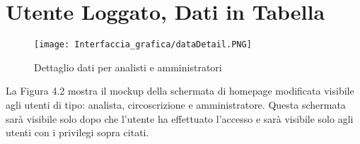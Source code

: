 \newpage
\section{Utente Loggato, Dati in Tabella}

    \begin{figure}[H]
        \center
        \texttt{[image: Interfaccia\_grafica/dataDetail.PNG]}
        \caption{Dettaglio dati per analisti e amministratori}
    \end{figure}    

    La Figura 4.2 mostra il mockup della schermata di homepage modificata visibile agli utenti di tipo: analista, circoscrizione e amministratore. Questa schermata sarà visibile solo dopo che l'utente ha effettuato l'accesso e sarà visibile solo agli utenti con i privilegi sopra citati.

